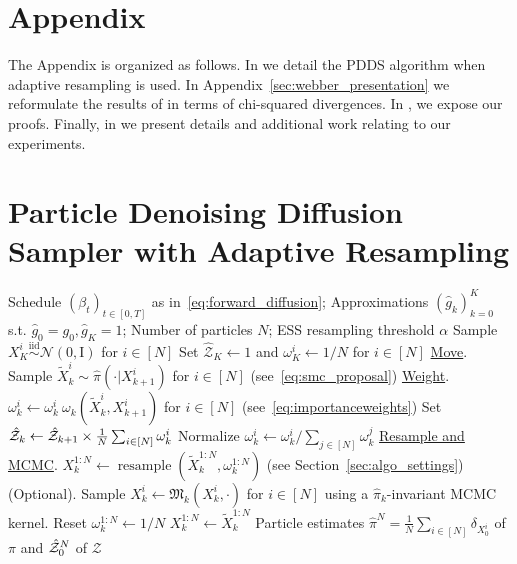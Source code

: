 \documentclass{article}
\theoremstyle{plain}
\theoremstyle{definition}
\theoremstyle{remark}
\begin{document}
\newpage
\appendix
\onecolumn

\section*{Appendix}
The Appendix is organized as follows. In  we detail the PDDS algorithm when adaptive resampling is used. In Appendix~\ref{sec:webber_presentation} we reformulate the results of \citet{webber2019unifying} in terms of chi-squared divergences. In , we expose our proofs. Finally, in  we present details and additional work relating to our experiments.

\section{Particle Denoising Diffusion Sampler with Adaptive Resampling}
\label{apx:adaptive_resampling}

\begin{algorithm}[H]
	\caption{Particle Denoising Diffusion Sampler with Adaptive Resampling}
	\label{algo:smc_dds_adaptive}
	\begin{algorithmic}
		\REQUIRE Schedule $(\beta_t)_{t \in [0,T]}$ as in~\eqref{eq:forward_diffusion}; Approximations $(\hat g_k)_{k=0}^K$ s.t. $\hat g_0=g_0, \hat g_K = 1$;
		Number of particles $N$; ESS resampling threshold $\alpha$
		\STATE Sample $X_K^i \overset{\mathrm{iid}}{\sim} \mathcal N(0, \mathrm{I})$ for $i \in [N]$
		\STATE Set $\hat {\mathcal Z}_K \gets 1$ and $\omega_K^i \gets 1/N$ for $i \in [N]$
		\STATE \underline{Move}. Sample $\tilde X_k^i \sim \hat \pi(\cdot|X_{k+1}^i)$ for $i \in [N]$ (see~\eqref{eq:smc_proposal})
		\STATE \underline{Weight}. $\omega_k^i \gets \omega_k^i~ \omega_k(\tilde X_k^i, X_{k+1}^i)$ for $i \in [N]$ (see~\eqref{eq:importanceweights})
		\STATE Set $\hat {\mathcal Z}_k \gets \hat {\mathcal Z}_{k+1} \times \frac 1N \sum_{i\in[N]} \omega_k^i$
		\STATE Normalize $\omega_k^i \gets \omega_k^i/\sum_{j\in[N]} \omega_k^j$
		\STATE \underline{Resample and MCMC}.
		\STATE $X_k^{1:N} \gets \operatorname{resample}(\tilde X_k^{1:N}, \omega_k^{1:N})$ (see Section~\ref{sec:algo_settings})
		\STATE (Optional). Sample $X_k^i \gets \mathfrak M_k(X_k^i, \cdot)$ for $i\in[N]$ using a $\hat \pi_k$-invariant MCMC kernel.
		\STATE Reset $\omega_k^{1:N} \gets 1/N$
		\ELSE
		\STATE $X_k^{1:N} \gets \tilde{X}_k^{1:N}$
		\ENDIF
		\ENDFOR
		\ENSURE Particle estimates $\hat \pi^N = \frac 1N \sum_{i\in[N]} \delta_{X_0^i}$ of $\pi$ and $\hat {\mathcal Z}^N_0$ of $\mathcal Z$
	\end{algorithmic}
\end{algorithm}
\end{document}
